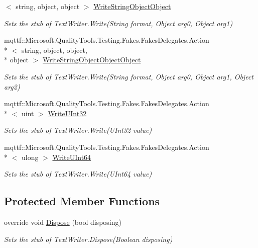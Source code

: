 \begin{DoxyCompactItemize}
$<$ string, object, object $>$ \hyperlink{class_system_1_1_i_o_1_1_fakes_1_1_stub_text_writer_a5bb0872a8b1bf6ee54c2b87ce96d896b}{Write\-String\-Object\-Object}
\begin{DoxyCompactList}\small\item\em Sets the stub of Text\-Writer.\-Write(\-String format, Object arg0, Object arg1)\end{DoxyCompactList}\item 
mqttf\-::\-Microsoft.\-Quality\-Tools.\-Testing.\-Fakes.\-Fakes\-Delegates.\-Action\\*
$<$ string, object, object, \\*
object $>$ \hyperlink{class_system_1_1_i_o_1_1_fakes_1_1_stub_text_writer_a5af143c2cc9570e4ae846b4b9347a6b3}{Write\-String\-Object\-Object\-Object}
\begin{DoxyCompactList}\small\item\em Sets the stub of Text\-Writer.\-Write(\-String format, Object arg0, Object arg1, Object arg2)\end{DoxyCompactList}\item 
mqttf\-::\-Microsoft.\-Quality\-Tools.\-Testing.\-Fakes.\-Fakes\-Delegates.\-Action\\*
$<$ uint $>$ \hyperlink{class_system_1_1_i_o_1_1_fakes_1_1_stub_text_writer_a5098cdf33a117b573c7fa765aa37f46b}{Write\-U\-Int32}
\begin{DoxyCompactList}\small\item\em Sets the stub of Text\-Writer.\-Write(\-U\-Int32 value)\end{DoxyCompactList}\item 
mqttf\-::\-Microsoft.\-Quality\-Tools.\-Testing.\-Fakes.\-Fakes\-Delegates.\-Action\\*
$<$ ulong $>$ \hyperlink{class_system_1_1_i_o_1_1_fakes_1_1_stub_text_writer_a5512898dcea58b876633a5ef337c6b23}{Write\-U\-Int64}
\begin{DoxyCompactList}\small\item\em Sets the stub of Text\-Writer.\-Write(\-U\-Int64 value)\end{DoxyCompactList}\end{DoxyCompactItemize}
\subsection*{Protected Member Functions}
\begin{DoxyCompactItemize}
\item 
override void \hyperlink{class_system_1_1_i_o_1_1_fakes_1_1_stub_text_writer_ae5adfc5ecc1eba6e10ca0a146ad8da55}{Dispose} (bool disposing)
\begin{DoxyCompactList}\small\item\em Sets the stub of Text\-Writer.\-Dispose(\-Boolean disposing)\end{DoxyCompactList}\end{DoxyCompactItemize}
